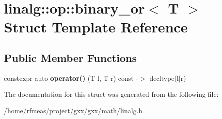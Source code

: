 \hypertarget{structlinalg_1_1op_1_1binary__or}{}\section{linalg\+:\+:op\+:\+:binary\+\_\+or$<$ T $>$ Struct Template Reference}
\label{structlinalg_1_1op_1_1binary__or}
\subsection*{Public Member Functions}
\begin{DoxyCompactItemize}
\item 
constexpr auto {\bfseries operator()} (T l, T r) const -\/$>$ decltype(l$\vert$r)\hypertarget{structlinalg_1_1op_1_1binary__or_a87e34114f8a7c5868cf7baebc67a891c}{}\label{structlinalg_1_1op_1_1binary__or_a87e34114f8a7c5868cf7baebc67a891c}

\end{DoxyCompactItemize}


The documentation for this struct was generated from the following file\+:\begin{DoxyCompactItemize}
\item 
/home/rfmeas/project/gxx/gxx/math/linalg.\+h\end{DoxyCompactItemize}

